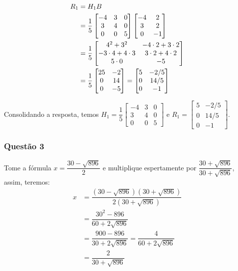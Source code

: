 \documentclass[12pt]{article}
\begin{document}
\begin{enumerate}[a)]
\begin{align*}
	R_1&=H_1B\\
	&=\frac15\begin{bmatrix}
		-4&3&0\\3&4&0\\0&0&5
	\end{bmatrix}\begin{bmatrix}-4&2\cr 3&2\cr 0&-1\cr \end{bmatrix}\\
&=\frac15\begin{bmatrix}
	4^2+3^2 &-4\cdot2+3\cdot2\\
	-3\cdot4+4\cdot3 & 3\cdot2+4\cdot2\\
	5\cdot0&-5
\end{bmatrix}\\
&=\frac15\begin{bmatrix}
	25&-2\\
	0&14\\
	0&-5
\end{bmatrix}=\begin{bmatrix}
5&-2/5\\
0&14/5\\
0&-1
\end{bmatrix}
\end{align*}

Consolidando a resposta, temos $H_1=\dfrac15\begin{bmatrix}
	-4&3&0\\3&4&0\\0&0&5
\end{bmatrix}$ e $R_1=\begin{bmatrix}
5&-2/5\\
0&14/5\\
0&-1
\end{bmatrix}$.
	\end{enumerate}

\subsubsection*{Questão 3}

Tome a fórmula $x=\dfrac{30-\sqrt{896}}{2}$ e multiplique espertamente por $\dfrac{30+\sqrt{896}}{30+\sqrt{896}}$, assim, teremos:
\begin{align*}
	x&=\dfrac{(30-\sqrt{896})(30+\sqrt{896})}{2(30+\sqrt{896})}\\
	&=\dfrac{30^2-896}{60+2\sqrt{896}}\\
	&=\dfrac{900-896}{30+2\sqrt{896}}=\dfrac{4}{60+2\sqrt{896}}\\
	&=\dfrac{2}{30+\sqrt{896}}
\end{align*}
\end{document}
